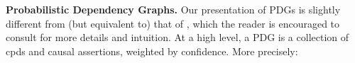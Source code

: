 \documentclass{article}
\begin{document}
\textbf{Probabilistic Dependency Graphs.}
Our presentation of PDGs is slightly
different from (but equivalent to) that of
\textcite{pdg-aaai}, which
the reader is encouraged to consult for more details and intuition.
At a high level, a PDG
is
a collection of cpds and causal assertions,
    weighted by confidence. More precisely:
\end{document}
